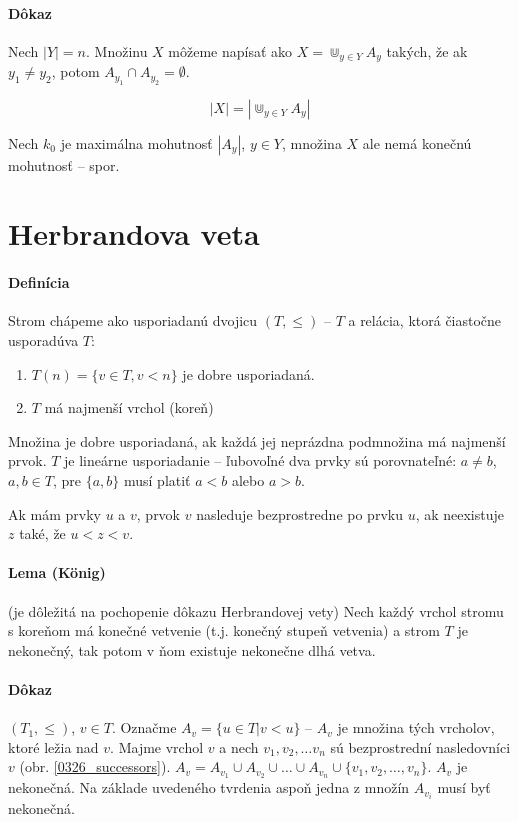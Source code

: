 \paragraph{Dôkaz} Nech $|Y|=n$. Množinu $X$ môžeme napísať ako $X=\Cup_{y\in
Y}A_y$ takých, že ak $y_1\neq y_2$, potom $A_{y_1} \cap A_{y_2} = \emptyset$.

$$ |X| = \left|\Cup_{y\in Y} A_y \right|$$

Nech $k_0$ je maximálna mohutnosť $|A_y|$, $y\in Y$, množina $X$ ale nemá
konečnú mohutnosť -- spor.
\section{Herbrandova veta}

\paragraph{Definícia} Strom chápeme ako usporiadanú dvojicu $(T,\leq)$ -- $T$ a
relácia, ktorá čiastočne usporadúva $T$:
\begin{enumerate}
	\item $T(n)=\{v\in T, v<n\}$ je dobre usporiadaná.
	\item $T$ má najmenší vrchol (koreň)
\end{enumerate}

Množina je dobre usporiadaná, ak každá jej neprázdna podmnožina má najmenší
prvok. $T$ je lineárne usporiadanie -- ľubovoľné dva prvky sú porovnateľné:
$a \neq b$, $a,b\in T$, pre $\{a, b\}$ musí platiť $a<b$ alebo $a>b$.

\par Ak mám prvky $u$ a $v$, prvok $v$ nasleduje bezprostredne po prvku $u$, ak
neexistuje $z$ také, že $u < z < v$.

\paragraph{Lema (K\"onig)} (je dôležitá na pochopenie dôkazu Herbrandovej vety)
Nech každý vrchol stromu s koreňom má konečné vetvenie (t.j. konečný stupeň
vetvenia) a strom $T$ je nekonečný, tak potom v ňom existuje nekonečne dlhá
vetva.

\paragraph{Dôkaz} $(T_1,\leq)$, $v \in T$. Označme $A_v = \{ u \in T | v <u
\}$ -- $A_v$ je množina tých vrcholov, ktoré ležia nad $v$. Majme vrchol $v$ a
nech $v_1, v_2, \ldots v_n$ sú bezprostrední nasledovníci $v$ (obr.
\ref{0326_successors}). $A_v = A_{v_1} \cup A_{v_2} \cup \ldots \cup A_{v_n}
\cup \{v_1, v_2, \ldots, v_n\}$. $A_v$ je nekonečná. Na základe uvedeného
tvrdenia aspoň jedna z množín $A_{v_i}$ musí byť nekonečná.

